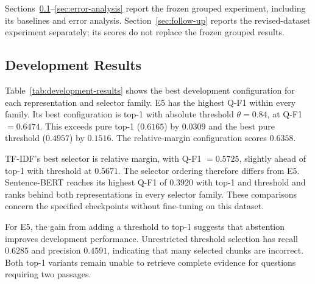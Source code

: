 \documentclass[11pt]{article}
\begin{document}
Sections~\ref{sec:development-results}--\ref{sec:error-analysis} report the frozen grouped experiment, including its baselines and error analysis. Section~\ref{sec:follow-up} reports the revised-dataset experiment separately; its scores do not replace the frozen grouped results.

\subsection{Development Results}
\label{sec:development-results}

Table~\ref{tab:development-results} shows the best development configuration for each representation and selector family. E5 has the highest Q-F1 within every family. Its best configuration is top-1 with absolute threshold $\theta=0.84$, at Q-F1 $=0.6474$. This exceeds pure top-1 ($0.6165$) by $0.0309$ and the best pure threshold ($0.4957$) by $0.1516$. The relative-margin configuration scores $0.6358$.

TF-IDF's best selector is relative margin, with Q-F1 $=0.5725$, slightly ahead of top-1 with threshold at $0.5671$. The selector ordering therefore differs from E5. Sentence-BERT reaches its highest Q-F1 of $0.3920$ with top-1 and threshold and ranks behind both representations in every selector family. These comparisons concern the specified checkpoints without fine-tuning on this dataset.

For E5, the gain from adding a threshold to top-1 suggests that abstention improves development performance. Unrestricted threshold selection has recall $0.6285$ and precision $0.4591$, indicating that many selected chunks are incorrect. Both top-1 variants remain unable to retrieve complete evidence for questions requiring two passages.
\end{document}
